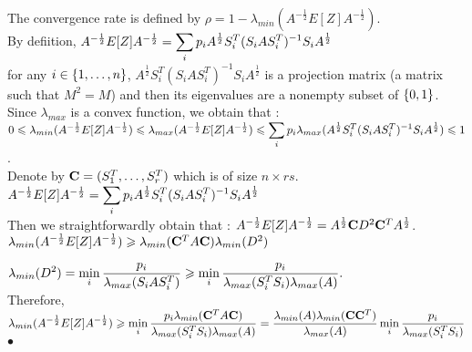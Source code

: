The convergence rate is defined by $\rho = 1 - \lambda_{min}(A^{-\frac12}E[Z]A^{-\frac12}  )$.\\

By defiition, $A^{-\frac12}E[Z]A^{-\frac12} = \dsp\sum\limits_{i} p_{i} A^{\frac 12} S_{i}^{T} (S_{i}  A  S_{i}^{T})^{-1} S_{i} A^{\frac 12}$ \\
for any $i \in \acco{1,\dots,n}$, $A^{\frac 12} S_{i}^{T} (S_{i}  A  S_{i}^{T})^{-1} S_{i} A^{\frac 12}$ is a projection matrix (a matrix such that $M^{2} = M$) and then its eigenvalues are a nonempty subset of $\acco{0,1}$.\\

Since $\lambda_{max}$ is a convex function, we obtain that :\\

$0 \leq \lambda_{min}(A^{-\frac12}E[Z]A^{-\frac12}) \leq  \lambda_{max}(A^{-\frac12}E[Z]A^{-\frac12}) \leq \dsp\sum\limits_{i} p_{i} \lambda_{max}(A^{\frac 12} S_{i}^{T} (S_{i}  A  S_{i}^{T})^{-1} S_{i} A^{\frac 12}) \leq 1$.\\

Denote by $\bold{C} = (S_{1}^{T},\dots,S_{r}^{T})$ which is of size $ n \times r s$.\\
\pr
$A^{-\frac12}E[Z]A^{-\frac12} = \dsp\sum\limits_{i} p_{i} A^{\frac 12} S_{i}^{T} (S_{i}  A  S_{i}^{T})^{-1} S_{i} A^{\frac 12}$ \\
Then we straightforwardly obtain that : $A^{-\frac12}E[Z]A^{-\frac12} = A^{\frac 12} \bold{C} D^{2} \bold{C}^{T} A^{\frac 12}$.\\

$\lambda_{min}(A^{-\frac12}E[Z]A^{-\frac12} ) \geq \lambda_{min}(\bold{C}^{T}A \bold{C} ) \lambda_{min}(D^{2})$

$\dsp \lambda_{min}(D^{2}) =  \min_{i}  \frac{p_{i}}{\lambda_{max}(S_{i} A S_{i}^{T} ) } \geq  \min_{i}\frac{p_{i} }{\lambda_{max}(S_{i}^{T} S_{i}) \lambda_{max}(A)}.$\\
 Therefore, 
$\dsp \lambda_{min}(A^{-\frac12}E[Z]A^{-\frac12} ) \geq  \min_{i}  \frac{p_{i} \lambda_{min}(\bold{C}^{T}A \bold{C} )}{\lambda_{max}(S_{i}^{T} S_{i}) \lambda_{max}(A) }  =  \frac{\lambda_{min}(A) \lambda_{min}(\bold{C} \bold{C}^{T} )}{ \lambda_{max}(A)} \min_{i} \frac{p_{i}}{\lambda_{max}(S_{i}^{T} S_{i})}$
$\bullet$



